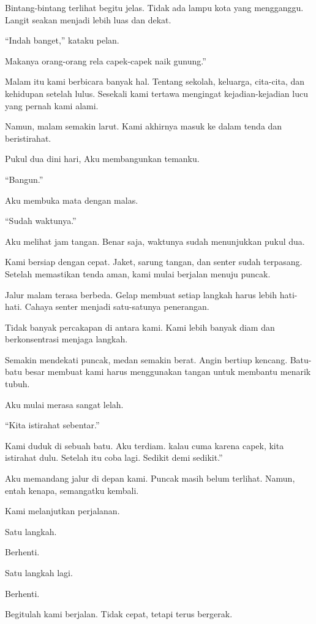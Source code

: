 Bintang-bintang terlihat begitu jelas. Tidak ada lampu kota yang mengganggu. Langit seakan menjadi lebih luas dan dekat.


“Indah banget,” kataku pelan.


Makanya orang-orang rela capek-capek naik gunung.”


Malam itu kami berbicara banyak hal. Tentang sekolah, keluarga, cita-cita, dan kehidupan setelah lulus. Sesekali kami tertawa mengingat kejadian-kejadian lucu yang pernah kami alami.


Namun, malam semakin larut. Kami akhirnya masuk ke dalam tenda dan beristirahat.


Pukul dua dini hari, Aku membangunkan temanku.


“Bangun.”


Aku membuka mata dengan malas.


“Sudah waktunya.”


Aku melihat jam tangan. Benar saja, waktunya sudah menunjukkan pukul dua.


Kami bersiap dengan cepat. Jaket, sarung tangan, dan senter sudah terpasang. Setelah memastikan tenda aman, kami mulai berjalan menuju puncak.


Jalur malam terasa berbeda. Gelap membuat setiap langkah harus lebih hati-hati. Cahaya senter menjadi satu-satunya penerangan.


Tidak banyak percakapan di antara kami. Kami lebih banyak diam dan berkonsentrasi menjaga langkah.


Semakin mendekati puncak, medan semakin berat. Angin bertiup kencang. Batu-batu besar membuat kami harus menggunakan tangan untuk membantu menarik tubuh.


Aku mulai merasa sangat lelah.


“Kita istirahat sebentar.”


Kami duduk di sebuah batu. Aku terdiam. kalau cuma karena capek, kita istirahat dulu. Setelah itu coba lagi. Sedikit demi sedikit.”


Aku memandang jalur di depan kami. Puncak masih belum terlihat. Namun, entah kenapa, semangatku kembali.


Kami melanjutkan perjalanan.


Satu langkah.


Berhenti.


Satu langkah lagi.


Berhenti.


Begitulah kami berjalan. Tidak cepat, tetapi terus bergerak.


